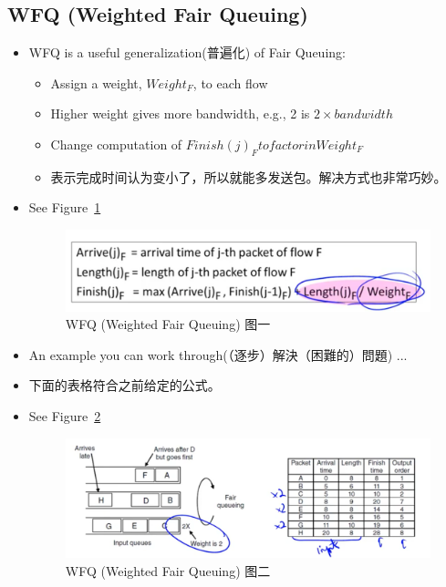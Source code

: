 \documentclass[12pt]{ctexart}   %
\begin{document}
	\subsection{WFQ (Weighted Fair Queuing)}
	\begin{itemize}
		\item WFQ is a useful generalization(普遍化) of Fair Queuing:
		\begin{itemize}
			\item Assign a weight, $Weight_{F}$, to each flow
			\item Higher weight gives more bandwidth, e.g., 2 is $2 \times bandwidth$
			\item Change computation of $Finish(j)_{F} to factor in Weight_{F}$
			\item 表示完成时间认为变小了，所以就能多发送包。解决方式也非常巧妙。
		\end{itemize}
		\item See Figure~\ref{fig:9-4-6}
		  
		 \begin{figure}[h!] %
		\centering
		 \includegraphics[scale=0.7]{images/9-4-6}
		\caption{ WFQ (Weighted Fair Queuing) 图一}
		 \label{fig:9-4-6}
		 \end{figure}
		 
		 \item An example you can work through(（逐步）解決（困難的）問題) ...
		 \item 下面的表格符合之前给定的公式。
		 \item See Figure~\ref{fig:9-4-7}
		  
		 \begin{figure}[h!] %
		\centering
		 \includegraphics[scale=0.7]{images/9-4-7}
		\caption{ WFQ (Weighted Fair Queuing) 图二}
		 \label{fig:9-4-7}
		 \end{figure}
	\end{itemize}
	
\end{document}
